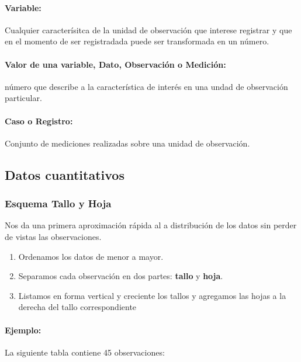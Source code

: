 \paragraph{Variable:} Cualquier caracterísitca de la unidad de observación que interese registrar y que en el momento de ser registradada puede ser transformada en un número.

\paragraph{Valor de una variable, Dato, Observación o Medición:} número que describe a la característica de interés en una undad de observación particular.

\paragraph{Caso o Registro:} Conjunto de mediciones realizadas sobre una unidad de observación.

\subsection{Datos cuantitativos}
\subsubsection{Esquema Tallo y Hoja}
Nos da una primera aproximación rápida al a distribución de los datos sin perder de vistas las observaciones.

\begin{enumerate}
	\item Ordenamos los datos de menor a mayor.
	\item Separamos cada observación en dos partes: \textbf{tallo} y \textbf{hoja}.
	\item Listamos en forma vertical y creciente los tallos y agregamos las hojas a la derecha del tallo correspondiente
\end{enumerate}

\paragraph{Ejemplo:} La siguiente tabla contiene 45 observaciones:

